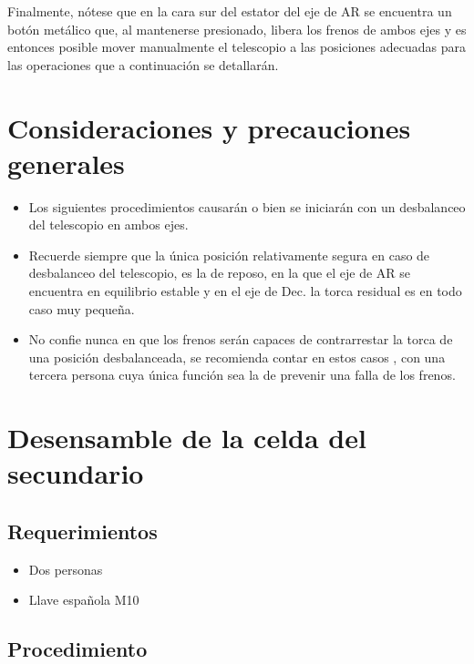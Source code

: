Finalmente, nótese que en la cara sur del estator del eje de AR se encuentra un botón metálico que, al mantenerse presionado, libera los frenos de ambos ejes y es entonces posible mover manualmente el telescopio a las posiciones adecuadas para las operaciones que a continuación se detallarán.

\section{Consideraciones y precauciones generales}

\begin{itemize}
\item Los siguientes procedimientos causarán o bien se iniciarán con un desbalanceo del telescopio en ambos ejes.
\item Recuerde siempre que la única posición relativamente segura en caso de desbalanceo del telescopio, es la de reposo, en la que el eje de AR se encuentra en equilibrio estable y en el eje de Dec. la torca residual es en todo caso muy pequeña.
\item No confie nunca en que los frenos serán capaces de contrarrestar la torca de una posición desbalanceada, se recomienda contar en estos casos , con una tercera persona cuya única función sea la de prevenir una falla de los frenos.
\end{itemize}

\section{Desensamble de la celda del secundario }

\subsection{Requerimientos}

\begin{itemize}
\item Dos personas
\item Llave española M10
\end{itemize}

\subsection{Procedimiento}

